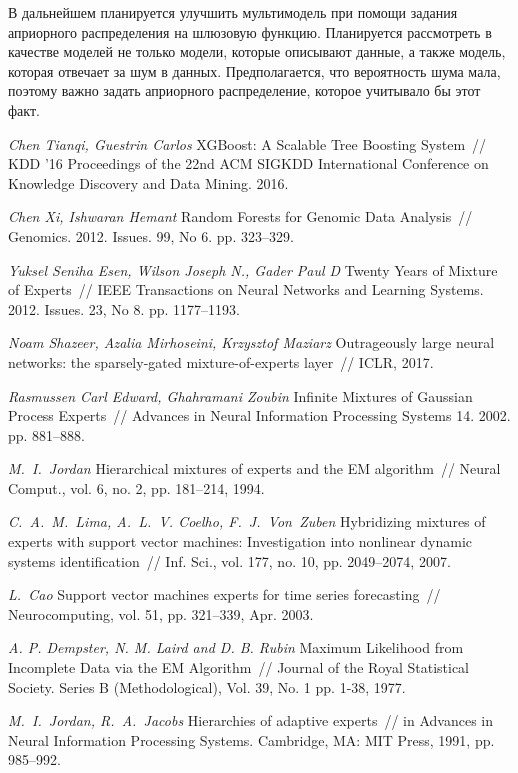 \documentclass[12pt, twoside]{article}
\numberwithin{equation}{section}
\begin{document}
В дальнейшем планируется улучшить мультимодель при помощи задания априорного распределения на шлюзовую функцию. Планируется рассмотреть в качестве моделей не только модели, которые описывают данные, а также модель, которая отвечает за шум в данных. Предполагается, что вероятность шума мала, поэтому важно задать априорного распределение, которое учитывало бы этот факт.


\begin{thebibliography}{99}
	\textit{Chen Tianqi, Guestrin Carlos} XGBoost: A Scalable Tree Boosting System~// KDD ’16 Proceedings of the 22nd ACM SIGKDD International Conference on Knowledge Discovery and Data Mining. 2016.
	
	\textit{Chen Xi, Ishwaran Hemant} Random Forests for Genomic Data Analysis~// Genomics. 2012. Issues. 99, No 6. pp. 323--329.

	\textit{Yuksel Seniha Esen, Wilson Joseph N., Gader Paul D} Twenty Years of Mixture of Experts~// IEEE Transactions on Neural Networks and Learning Systems. 2012. Issues. 23, No 8. pp. 1177–1193.

	\textit{Noam Shazeer, Azalia Mirhoseini, Krzysztof Maziarz} Outrageously large neural networks: the sparsely-gated mixture-of-experts layer~// ICLR, 2017.

	\textit{Rasmussen Carl Edward, Ghahramani Zoubin} Infinite Mixtures of Gaussian Process Experts~// Advances in Neural Information Processing Systems 14. 2002. pp. 881–888.
	
	\textit{M.~I.~Jordan} Hierarchical mixtures of experts and the EM algorithm~// Neural Comput., vol. 6, no. 2, pp. 181–214, 1994.
	
	\textit{C.~A.~M.~Lima, A.~L.~V. Coelho, F.~J.~Von~Zuben} Hybridizing mixtures of experts with support vector machines: Investigation into nonlinear dynamic systems identification~// Inf. Sci., vol. 177, no. 10, pp. 2049–2074, 2007.

	\textit{L.~Cao} Support vector machines experts for time series forecasting~// Neurocomputing, vol. 51, pp. 321–339, Apr. 2003.

	\textit{A. P. Dempster, N. M. Laird and D. B. Rubin} Maximum Likelihood from Incomplete Data via the EM Algorithm~// Journal of the Royal Statistical Society. Series B (Methodological), Vol. 39, No. 1 pp. 1-38, 1977.
	
	\textit{M.~I.~Jordan, R.~A.~Jacobs} Hierarchies of adaptive experts~// in Advances in Neural Information Processing Systems. Cambridge, MA: MIT Press, 1991, pp. 985–992.

 \end{thebibliography}
\end{document}
